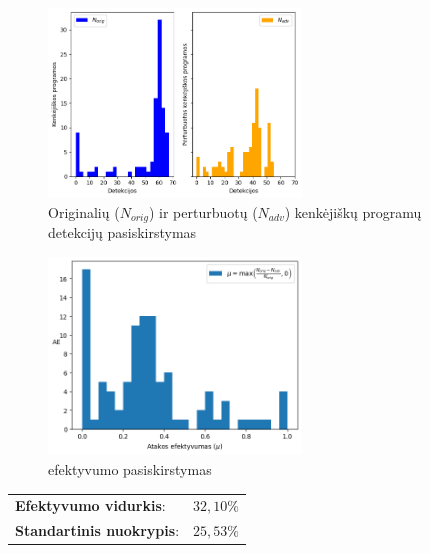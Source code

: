 \begin{figure}[h]
    \begin{small}
        \begin{center}
            \includegraphics[width=0.6\textwidth]{img/det_distributions.png}
        \end{center}
        \caption{Originalių ($N_{orig}$) ir perturbuotų ($N_{adv}$) kenkėjiškų programų detekcijų pasiskirstymas}\label{fig:experiment:det_dist}
    \end{small}
\end{figure}

\begin{figure}[h]
    \begin{small}
        \begin{center}
            \includegraphics[width=0.6\textwidth]{img/mu_distribution.png}
        \end{center}
        \caption{ efektyvumo pasiskirstymas}\label{fig:experiment:mu_dist}
    \end{small}
\end{figure}

\begin{tabular}{ll}
    \textbf{Efektyvumo vidurkis}:    & $32,10\%$ \\
    \textbf{Standartinis nuokrypis}: & $25,53\%$
\end{tabular}